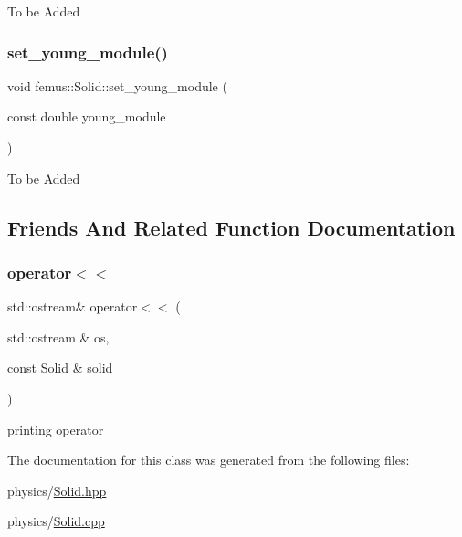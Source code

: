 To be Added \mbox{\label{classfemus_1_1_solid_afdf6ba9c09e68bfc8e3d995eb039b311}} 
\subsubsection{\texorpdfstring{set\+\_\+young\+\_\+module()}{set\_young\_module()}}
{\footnotesize\ttfamily void femus\+::\+Solid\+::set\+\_\+young\+\_\+module (\begin{DoxyParamCaption}\item[{const double}]{young\+\_\+module }\end{DoxyParamCaption})}

To be Added 

\subsection{Friends And Related Function Documentation}
\mbox{\label{classfemus_1_1_solid_a22707c24a86d849cae294b1d0dea3571}} 
\subsubsection{\texorpdfstring{operator$<$$<$}{operator<<}}
{\footnotesize\ttfamily std\+::ostream\& operator$<$$<$ (\begin{DoxyParamCaption}\item[{std\+::ostream \&}]{os,  }\item[{const \mbox{\hyperlink{classfemus_1_1_solid}{Solid}} \&}]{solid }\end{DoxyParamCaption})\hspace{0.3cm}{\ttfamily [friend]}}

printing operator 

The documentation for this class was generated from the following files\+:\begin{DoxyCompactItemize}
\item 
physics/\mbox{\hyperlink{_solid_8hpp}{Solid.\+hpp}}\item 
physics/\mbox{\hyperlink{_solid_8cpp}{Solid.\+cpp}}\end{DoxyCompactItemize}
